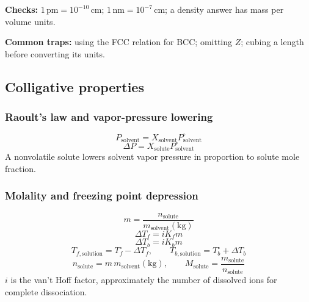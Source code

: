 \textbf{Checks:} \(1\,\mathrm{pm}=10^{-10}\,\mathrm{cm}\); \(1\,\mathrm{nm}=10^{-7}\,\mathrm{cm}\); a density answer has mass per volume units.

\textbf{Common traps:} using the FCC relation for BCC; omitting \(Z\); cubing a length before converting its units.

\subsection{Colligative properties}

\subsubsection{Raoult's law and vapor-pressure lowering}
\begin{equation}
\label{eq:phase:raoult-solvent-pressure}
P_{\mathrm{solvent}}=X_{\mathrm{solvent}}P^\circ_{\mathrm{solvent}}
\end{equation}
\begin{equation}
\label{eq:phase:vapor-pressure-lowering}
\Delta P=X_{\mathrm{solute}}P^\circ_{\mathrm{solvent}}
\end{equation}
A nonvolatile solute lowers solvent vapor pressure in proportion to solute mole fraction.

\subsubsection{Molality and freezing point depression}
\begin{equation}
\label{eq:phase:molality}
m=\frac{n_{\mathrm{solute}}}{m_{\mathrm{solvent}}(\mathrm{kg})}
\end{equation}
\begin{equation}
\label{eq:phase:freezing-point-depression}
\Delta T_f=iK_fm
\end{equation}
\begin{equation}
\label{eq:phase:boiling-point-elevation}
\Delta T_b=iK_bm
\end{equation}
\begin{equation}
\label{eq:phase:solution-transition-temperature}
T_{f,\mathrm{solution}}=T_f^\circ-\Delta T_f, \qquad
T_{b,\mathrm{solution}}=T_b^\circ+\Delta T_b
\end{equation}
\begin{equation}
\label{eq:phase:solute-molar-mass}
n_{\mathrm{solute}}=m\,m_{\mathrm{solvent}}(\mathrm{kg}), \qquad
M_{\mathrm{solute}}=\frac{m_{\mathrm{solute}}}{n_{\mathrm{solute}}}
\end{equation}
\(i\) is the van't Hoff factor, approximately the number of dissolved ions for complete dissociation.

